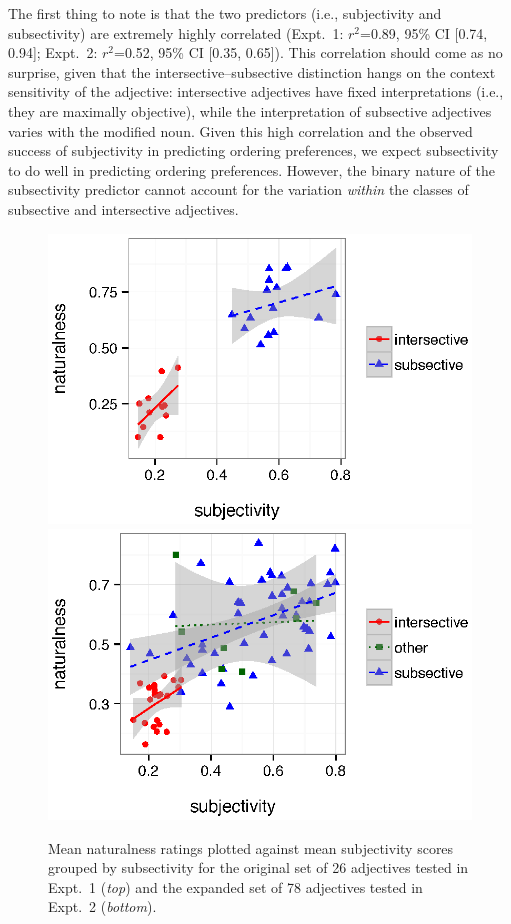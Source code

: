 \documentclass[12pt]{article}
\begin{document}
The first thing to note is that the two predictors (i.e., subjectivity and subsectivity) are extremely highly correlated (Expt.~1: $r^2${=}0.89, 95\% CI [0.74,  0.94]; Expt.~2: $r^2${=}0.52, 95\% CI [0.35,  0.65]). This correlation should come as no surprise, given that the intersective--subsective distinction hangs on the context sensitivity of the adjective: intersective adjectives have fixed interpretations (i.e., they are maximally objective), while the interpretation of subsective adjectives varies with the modified noun. Given this high correlation and the observed success of subjectivity in predicting ordering preferences, we expect subsectivity to do well in predicting ordering preferences. However, the binary nature of the subsectivity predictor cannot account for the variation \emph{within} the classes of subsective and intersective adjectives. 

\renewcommand\thefigure{S.\arabic{figure}}
\begin{figure}
	\centering\includegraphics[width=4.5in]{plots/expt1-subjectivity-subsectivity.eps}\\\includegraphics[width=4.5in]{plots/expt3-subjectivity-subsectivity.eps}
	\caption{Mean naturalness ratings plotted against mean subjectivity scores grouped by subsectivity for the original set of 26 adjectives tested in Expt.~1 (\emph{top}) and the expanded set of 78 adjectives tested in Expt.~2 (\emph{bottom}).}\label{fig:subsectivity}
\end{figure}
\end{document}
